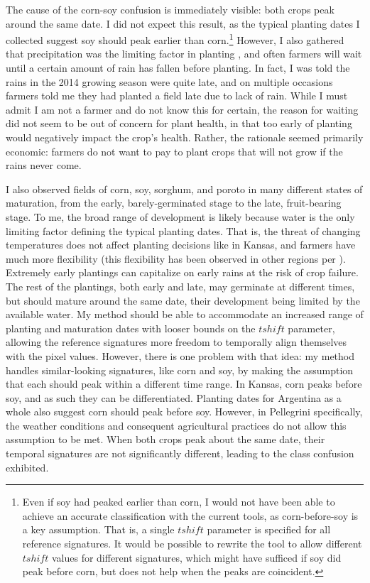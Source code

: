 The cause of the corn-soy confusion is immediately visible: both crops peak around the same date. I did not expect this result, as the typical planting dates I collected suggest soy should peak earlier than corn.\footnote{Even if soy had peaked earlier than corn, I would not have been able to achieve an accurate classification with the current tools, as corn-before-soy is a key assumption. That is, a single $tshift$ parameter is specified for all reference signatures. It would be possible to rewrite the tool to allow different $tshift$ values for different signatures, which might have sufficed if soy did peak before corn, but does not help when the peaks are coincident.} However, I also gathered that precipitation was the limiting factor in planting \autocite[confirmed by][]{sacks2010crop}, and often farmers will wait until a certain amount of rain has fallen before planting. In fact, I was told the rains in the 2014 growing season were quite late, and on multiple occasions farmers told me they had planted a field late due to lack of rain. While I must admit I am not a farmer and do not know this for certain, the reason for waiting did not seem to be out of concern for plant health, in that too early of planting would negatively impact the crop's health. Rather, the rationale seemed primarily economic: farmers do not want to pay to plant crops that will not grow if the rains never come.

I also observed fields of corn, soy, sorghum, and poroto in many different states of maturation, from the early, barely-germinated stage to the late, fruit-bearing stage. To me, the broad range of development is likely because water is the only limiting factor defining the typical planting dates. That is, the threat of changing temperatures does not affect planting decisions like in Kansas, and farmers have much more flexibility (this flexibility has been observed in other regions per \textcite{sacks2010crop}). Extremely early plantings can capitalize on early rains at the risk of crop failure. The rest of the plantings, both early and late, may germinate at different times, but should mature around the same date, their development being limited by the available water. My method should be able to accommodate an increased range of planting and maturation dates with looser bounds on the $tshift$ parameter, allowing the reference signatures more freedom to temporally align themselves with the pixel values. However, there is one problem with that idea: my method handles similar-looking signatures, like corn and soy, by making the assumption that each should peak within a different time range. In Kansas, corn peaks before soy, and as such they can be differentiated. Planting dates for Argentina as a whole also suggest corn should peak before soy. However, in Pellegrini specifically, the weather conditions and consequent agricultural practices do not allow this assumption to be met. When both crops peak about the same date, their temporal signatures are not significantly different, leading to the class confusion exhibited.

